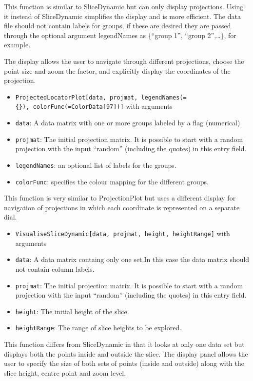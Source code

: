 \documentclass[]{interact}
\theoremstyle{plain}%
\theoremstyle{definition}
\theoremstyle{remark}
\begin{document}
This function is similar to SliceDynamic but can only display
projections. Using it instead of SliceDynamic simplifies the display and
is more efficient. The data file should not contain labels for groups,
if these are desired they are passed through the optional argument
legendNames as \{``group 1'', ``group 2'',\ldots\}, for example.

The display allows the user to navigate through different projections,
choose the point size and zoom the factor, and explicitly display the
coordinates of the projection.

\begin{itemize}
\item
  \texttt{ProjectedLocatorPlot{[}data,\ projmat,\ legendNames(=\{\}),\ colorFunc(=ColorData{[}97{]}){]}}
  with arguments
\item
  \texttt{data}: A data matrix with one or more groups labeled by a flag
  (numerical)
\item
  \texttt{projmat}: The initial projection matrix. It is possible to
  start with a random projection with the input ``random'' (including
  the quotes) in this entry field.
\item
  \texttt{legendNames}: an optional list of labels for the groups.
\item
  \texttt{colorFunc}: specifies the colour mapping for the different
  groups.
\end{itemize}

This function is very similar to ProjectionPlot but uses a different
display for navigation of projections in which each coordinate is
represented on a separate dial.

\begin{itemize}
\item
  \texttt{VisualiseSliceDynamic{[}data,\ projmat,\ height,\ heightRange{]}}
  with arguments
\item
  \texttt{data}: A data matrix containg only one set.In this case the
  data matrix should not contain column labels.
\item
  \texttt{projmat}: The initial projection matrix. It is possible to
  start with a random projection with the input ``random'' (including
  the quotes) in this entry field.
\item
  \texttt{height}: The initial height of the slice.
\item
  \texttt{heightRange}: The range of slice heights to be explored.
\end{itemize}

This function differs from SliceDynamic in that it looks at only one
data set but displays both the points inside and outside the slice. The
display panel allows the user to specify the size of both sets of points
(inside and outside) along with the slice height, centre point and zoom
level.



\end{document}
